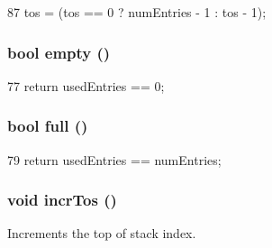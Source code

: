 \begin{DoxyCode}
87     { tos = (tos == 0 ? numEntries - 1 : tos - 1); }
\end{DoxyCode}
\hypertarget{classReturnAddrStack_a3f37b042a1e7cd4bd38fc564de81f0da}{
\subsubsection[{empty}]{\setlength{\rightskip}{0pt plus 5cm}bool empty ()}}
\label{classReturnAddrStack_a3f37b042a1e7cd4bd38fc564de81f0da}



\begin{DoxyCode}
77 { return usedEntries == 0; }
\end{DoxyCode}
\hypertarget{classReturnAddrStack_a825cad95d5a85dba2844e74f50c174a3}{
\subsubsection[{full}]{\setlength{\rightskip}{0pt plus 5cm}bool full ()}}
\label{classReturnAddrStack_a825cad95d5a85dba2844e74f50c174a3}



\begin{DoxyCode}
79 { return usedEntries == numEntries; }
\end{DoxyCode}
\hypertarget{classReturnAddrStack_a5ad6ef5933499ac13bf56455603ed00d}{
\subsubsection[{incrTos}]{\setlength{\rightskip}{0pt plus 5cm}void incrTos ()}}
\label{classReturnAddrStack_a5ad6ef5933499ac13bf56455603ed00d}
Increments the top of stack index. 


